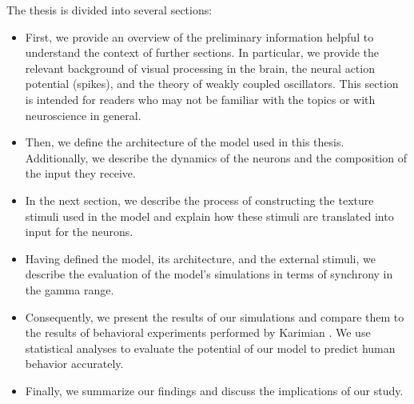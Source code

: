 The thesis is divided into several sections:
\begin{itemize}
    \item First, we provide an overview of the preliminary information helpful to understand the context of further sections. In particular, we provide the relevant background of visual processing in the brain, the neural action potential (spikes), and the theory of weakly coupled oscillators. This section is intended for readers who may not be familiar with the topics or with neuroscience in general.

    \item Then, we define the architecture of the model used in this thesis. Additionally, we describe the dynamics of the neurons and the composition of the input they receive.

    \item In the next section, we describe the process of constructing the texture stimuli used in the model and explain how these stimuli are translated into input for the neurons.

    \item Having defined the model, its architecture, and the external stimuli, we describe the evaluation of the model's simulations in terms of synchrony in the gamma range.

    \item Consequently, we present the results of our simulations and compare them to the results of behavioral experiments performed by Karimian \cite{MaryamPLACEHOLDER}. We use statistical analyses to evaluate the potential of our model to predict human behavior accurately.

    \item Finally, we summarize our findings and discuss the implications of our study.
\end{itemize}